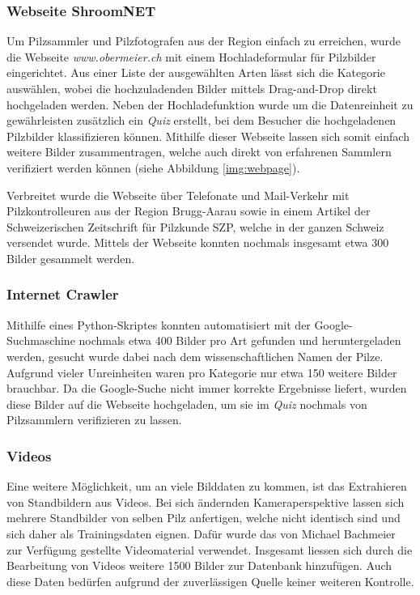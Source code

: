 \subsubsection{Webseite ShroomNET}
Um Pilzsammler und Pilzfotografen aus der Region einfach zu erreichen, wurde die Webseite \textit{www.obermeier.ch} mit einem Hochladeformular für Pilzbilder eingerichtet. Aus einer Liste der ausgewählten Arten lässt sich die Kategorie auswählen, wobei die hochzuladenden Bilder mittels Drag-and-Drop direkt hochgeladen werden. Neben der Hochladefunktion wurde um die Datenreinheit zu gewährleisten zusätzlich ein \textit{Quiz} erstellt, bei dem Besucher die hochgeladenen Pilzbilder klassifizieren können. Mithilfe dieser Webseite lassen sich somit einfach weitere Bilder zusammentragen, welche auch direkt von erfahrenen Sammlern verifiziert werden können (siehe Abbildung \ref{img:webpage}).

Verbreitet wurde die Webseite über Telefonate und Mail-Verkehr mit Pilzkontrolleuren aus der Region Brugg-Aarau sowie in einem Artikel der Schweizerischen Zeitschrift für Pilzkunde SZP\cite{szp}, welche in der ganzen Schweiz versendet wurde. Mittels der Webseite konnten nochmals insgesamt etwa 300 Bilder gesammelt werden.

\subsubsection{Internet Crawler}
Mithilfe eines Python-Skriptes\cite{crawler} konnten automatisiert mit der Google-Suchmaschine nochmals etwa 400 Bilder pro Art gefunden und heruntergeladen werden, gesucht wurde dabei nach dem wissenschaftlichen Namen der Pilze. Aufgrund vieler Unreinheiten waren pro Kategorie nur etwa 150 weitere Bilder brauchbar. Da die Google-Suche nicht immer korrekte Ergebnisse liefert, wurden diese Bilder auf die Webseite hochgeladen, um sie im \textit{Quiz} nochmals von Pilzsammlern verifizieren zu lassen. 

\subsubsection{Videos}
Eine weitere Möglichkeit, um an viele Bilddaten zu kommen, ist das Extrahieren von Standbildern aus Videos. Bei sich ändernden Kameraperspektive lassen sich mehrere Standbilder von selben Pilz anfertigen, welche nicht identisch sind und sich daher als Trainingsdaten eignen. Dafür wurde das von Michael Bachmeier\cite{bachmeier} zur Verfügung gestellte Videomaterial verwendet. Insgesamt liessen sich durch die Bearbeitung von Videos weitere 1500 Bilder zur Datenbank hinzufügen. Auch diese Daten bedürfen aufgrund der zuverlässigen Quelle keiner weiteren Kontrolle.

